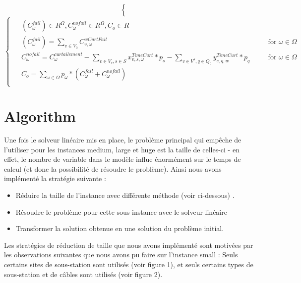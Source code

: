 \documentclass[a4paper,12pt]{article}
\begin{document}
\begin {enumerate}
{\begin{equation}
\begin{cases}
\begin{alignedat}{2}
            \end{alignedat}
        \end{cases}
    \end{equation}
    \begin{equation}
        \begin{cases}
            \begin{alignedat}{2}
                & (C_{\omega}^{fail}) \in R^{\Omega}, C_{\omega}^{nofail} \in R^{\Omega}, C_{o} \in R\\
                & (C_{\omega}^{fail}) = \sum_{v \in V_{0}} C_{v,\omega}^{wCurtFail} &&\quad \text{for } \omega \in \Omega \\
                & C_{\omega}^{nofail} = C_\omega^{curtailement} - \sum_{v \in V_{s},s \in S} x_{v,s,\omega}^{TimeCurt}*p_s - \sum_{v \in V^s, q \in Q_{0}} y_{e,q,w}^{TimeCurt}*p_{q} && \quad \text{for } \omega \in \Omega \\
                & C_{o} = \sum_{\omega \in \Omega} p_{\omega} * (C_{\omega}^{fail} + C_{\omega}^{nofail}) \\
            \end{alignedat}
        \end{cases}
    \end{equation}
}


\end{enumerate}

\section {Algorithm}
Une fois le solveur linéaire mis en place, le problème principal qui empêche de l'utiliser pour les instances medium, large et huge est la taille de celles-ci - en effet, le nombre de variable dans le modèle influe énormément sur le temps de calcul (et donc la possibilité de résoudre le problème). 
Ainsi nous avons implémenté la stratégie suivante :
\begin{itemize}
    \item Réduire la taille de l'instance avec différente méthode (voir ci-dessous) .
    \item Résoudre le problème pour cette sous-instance avec le solveur linéaire
    \item Transformer la solution obtenue en une solution du problème initial.
\end{itemize}
Les stratégies de réduction de taille que nous avons implémenté sont motivées par les observations suivantes que nous avons pu faire sur l'instance small :
Seuls certains sites de sous-station sont utilisés (voir figure 1), et seuls certains types de sous-station et de câbles sont utilisés (voir figure 2).
\end{document}

